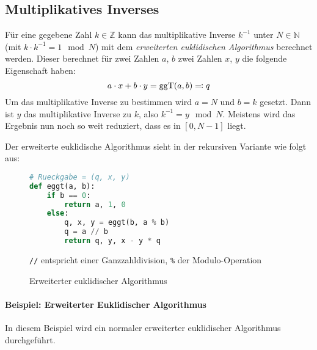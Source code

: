 		\subsection{Multiplikatives Inverses}
			Für eine gegebene Zahl \(k \in \mathbb{Z} \) kann das multiplikative Inverse \( k^{-1} \) unter \(N \in \mathbb{N} \) (mit \( k \cdot k^{-1} = 1 \mod N \)) mit dem \textit{erweiterten euklidischen Algorithmus} berechnet werden. Dieser berechnet für zwei Zahlen \(a\), \(b\) zwei Zahlen \( x \), \( y \) die folgende Eigenschaft haben:
			\begin{equation*}
				a \cdot x + b \cdot y = \textrm{ggT}(a, b) \eqqcolon q
			\end{equation*}
			Um das multiplikative Inverse zu bestimmen wird \( a = N \) und \( b = k \) gesetzt. Dann ist \(y\) das multiplikative Inverse zu \(k\), also \(k^{-1} = y \mod N \). Meistens wird das Ergebnis nun noch so weit reduziert, dass es in \( [0, N - 1] \) liegt.

			Der erweiterte euklidische Algorithmus sieht in der rekursiven Variante wie folgt aus:
			\begin{figure}[H]
				\centering
				\begin{lstlisting}[language = Python]
# Rueckgabe = (q, x, y)
def eggt(a, b):
	if b == 0:
		return a, 1, 0
	else:
		q, x, y = eggt(b, a % b)
		q = a // b
		return q, y, x - y * q
\end{lstlisting}
				\texttt{//} entspricht einer Ganzzahldivision, \texttt{\%} der Modulo-Operation
				\caption{Erweiterter euklidischer Algorithmus}
			\end{figure}

			\paragraph{Beispiel: Erweiterter Euklidischer Algorithmus}
				In diesem Beispiel wird ein normaler erweiterter euklidischer Algorithmus durchgeführt.

